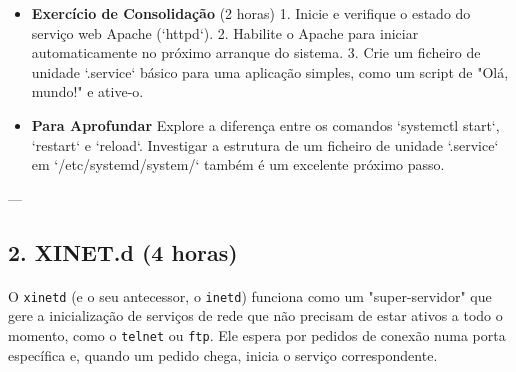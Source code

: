 \documentclass[10pt,a4paper]{article}
\begin{document}
\begin{itemize}
		\item \textbf{Exercício de Consolidação} (2 horas)
		1. Inicie e verifique o estado do serviço web Apache (`httpd`).
		2. Habilite o Apache para iniciar automaticamente no próximo arranque do sistema.
		3. Crie um ficheiro de unidade `.service` básico para uma aplicação simples, como um script de "Olá, mundo!" e ative-o.
		
		\item \textbf{Para Aprofundar}
		Explore a diferença entre os comandos `systemctl start`, `restart` e `reload`. Investigar a estrutura de um ficheiro de unidade `.service` em `/etc/systemd/system/` também é um excelente próximo passo.
	\end{itemize}
	
	---
	
	\subsection*{2. XINET.d (4 horas)}
	\vspace{-1.2em}
	\paragraph{}
	O \texttt{xinetd} (e o seu antecessor, o \texttt{inetd}) funciona como um "super-servidor" que gere a inicialização de serviços de rede que não precisam de estar ativos a todo o momento, como o \texttt{telnet} ou \texttt{ftp}. Ele espera por pedidos de conexão numa porta específica e, quando um pedido chega, inicia o serviço correspondente.
	
\end{document}
